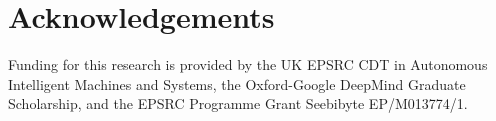 \documentclass{article}
\def\psec{\vspace{-4pt}}
\begin{document}
\psec
\psec
\section{Acknowledgements}
\psec
Funding for this research is provided by the UK EPSRC
CDT in Autonomous Intelligent Machines and Systems, 
the Oxford-Google DeepMind Graduate Scholarship, and the EPSRC 
Programme Grant Seebibyte EP/M013774/1.






\clearpage

{\footnotesize

}
\end{document}
